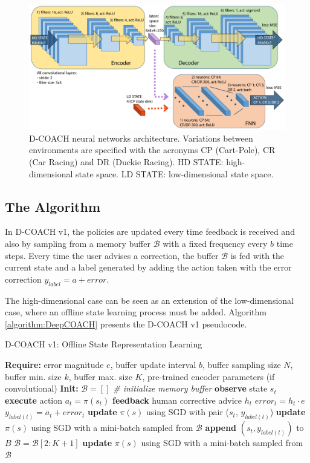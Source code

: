 \begin{figure}[h]
    \centering
    \includegraphics[width=0.9\linewidth]{imagenes/cap2/ISER_diagram.pdf}
    \caption{D-COACH neural networks architecture. Variations between environments are specified with the acronyms CP (Cart-Pole), CR (Car Racing) and DR (Duckie Racing). HD STATE: high-dimensional state space. LD STATE: low-dimensional state space.}
    \label{fig:network_diagram}
\end{figure}

\subsection{The Algorithm}
In D-COACH v1, the policies are updated every time feedback is received and also by sampling from a memory buffer $\mathcal{B}$ with a fixed frequency every $b$ time steps. Every time the user advises a correction, the buffer $\mathcal{B}$ is fed with the current state and a label generated by adding the action taken with the error correction $y_{label}=a+\mathit{error}$.

The high-dimensional case can be seen as an extension of the low-dimensional case, where an offline state learning process must be added. Algorithm \ref{algorithm:DeepCOACH} presents the D-COACH v1 pseudocode.

\begin{algorithm}[h]
\caption{D-COACH v1: Offline State Representation Learning}\label{algorithm:DeepCOACH}
\begin{algorithmic}[1]
\State \textbf{Require:} error magnitude $e$, buffer update interval $b$, buffer sampling size $N$, buffer min. size $k$, buffer max. size $K$, pre-trained encoder parameters (if convolutional) 
\State \textbf{Init:} $\mathcal{B} = []$  \emph{\# initialize memory buffer}
\State \textbf{observe} state $s_{t}$
\State \textbf{execute} action $a_{t}=\pi(s_{t})$
\State \textbf{feedback} human corrective advice $h_{t}$
\State $\mathit{error}_{t} = h_{t}\cdot e$
\State $y_{label(t)} = a_{t} + \mathit{error}_{t}$ 
\State \textbf{update} $\pi(s)$ using SGD with pair ($s_{t}$, $y_{\mathit{label}(t)}$) 
\State \textbf{update} $\pi(s)$ using SGD with a mini-batch sampled from $\mathcal{B}$
\State \textbf{append} $(s_{t}, y_{\mathit{label}(t)})$ to $B$
\State $\mathcal{B} = \mathcal{B}[2:K+1]$
\EndIf
\EndIf
{}
\State \textbf{update} $\pi(s)$ using SGD with a mini-batch sampled from $\mathcal{B}$
\EndIf
\EndFor
\end{algorithmic}
\end{algorithm}

